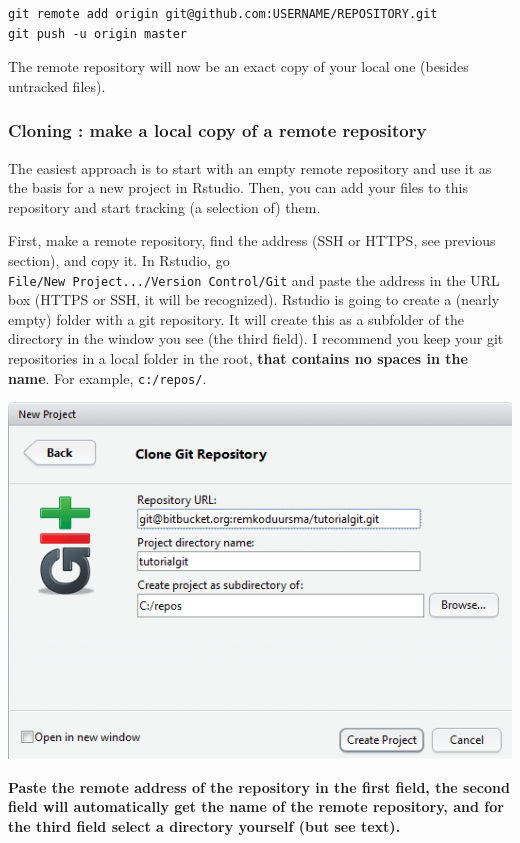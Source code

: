 \documentclass[]{book}
\begin{document}
\begin{verbatim}
git remote add origin git@github.com:USERNAME/REPOSITORY.git
git push -u origin master
\end{verbatim}

The remote repository will now be an exact copy of your local one (besides untracked files).

\hypertarget{cloning-make-a-local-copy-of-a-remote-repository}{%
\subsubsection{Cloning : make a local copy of a remote repository}\label{cloning-make-a-local-copy-of-a-remote-repository}}

The easiest approach is to start with an empty remote repository and use it as the basis for a new project in Rstudio. Then, you can add your files to this repository and start tracking (a selection of) them.

First, make a remote repository, find the address (SSH or HTTPS, see previous section), and copy it. In Rstudio, go \texttt{File/New\ Project.../Version\ Control/Git} and paste the address in the URL box (HTTPS or SSH, it will be recognized). Rstudio is going to create a (nearly empty) folder with a git repository. It will create this as a subfolder of the directory in the window you see (the third field). I recommend you keep your git repositories in a local folder in the root, \textbf{that contains no spaces in the name}. For example, \texttt{c:/repos/}.

\includegraphics[width=0.75\linewidth]{screenshots/clonegitrepos}

\textbf{Paste the remote address of the repository in the first field, the second field will automatically get the name of the remote repository, and for the third field select a directory yourself (but see text).}
\end{document}
